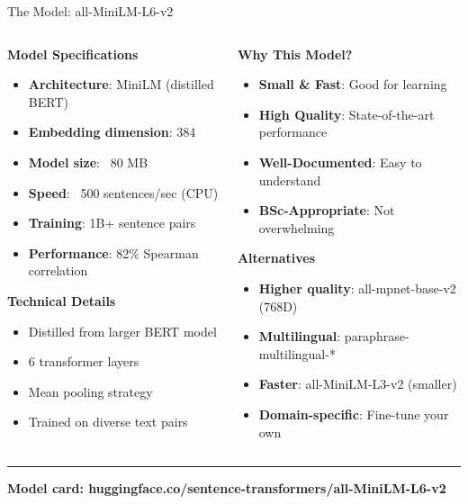 \documentclass[8pt,aspectratio=169]{beamer}
\newcommand{\bottomnote}[1]{%
\vfill
\vspace{-2mm}
\textcolor{mllavender2}{\rule{\textwidth}{0.4pt}}
\vspace{1mm}
\footnotesize
\textbf{#1}
}
\begin{document}
\begin{frame}[t]{The Model: all-MiniLM-L6-v2}

\begin{columns}[t]
\begin{column}{0.48\textwidth}
\textbf{Model Specifications}

\begin{itemize}
    \item \textbf{Architecture}: MiniLM (distilled BERT)
    \item \textbf{Embedding dimension}: 384
    \item \textbf{Model size}: ~80 MB
    \item \textbf{Speed}: ~500 sentences/sec (CPU)
    \item \textbf{Training}: 1B+ sentence pairs
    \item \textbf{Performance}: 82\% Spearman correlation
\end{itemize}

\vspace{0.5cm}

\textbf{Technical Details}
\begin{itemize}
    \item Distilled from larger BERT model
    \item 6 transformer layers
    \item Mean pooling strategy
    \item Trained on diverse text pairs
\end{itemize}
\end{column}

\begin{column}{0.48\textwidth}
\textbf{Why This Model?}

\begin{itemize}
    \item \textbf{Small \& Fast}: Good for learning
    \item \textbf{High Quality}: State-of-the-art performance
    \item \textbf{Well-Documented}: Easy to understand
    \item \textbf{BSc-Appropriate}: Not overwhelming
\end{itemize}

\vspace{0.5cm}

\textbf{Alternatives}

\begin{itemize}
    \item \textbf{Higher quality}: all-mpnet-base-v2 (768D)
    \item \textbf{Multilingual}: paraphrase-multilingual-*
    \item \textbf{Faster}: all-MiniLM-L3-v2 (smaller)
    \item \textbf{Domain-specific}: Fine-tune your own
\end{itemize}
\end{column}
\end{columns}

\bottomnote{Model card: huggingface.co/sentence-transformers/all-MiniLM-L6-v2}
\end{frame}
\end{document}
